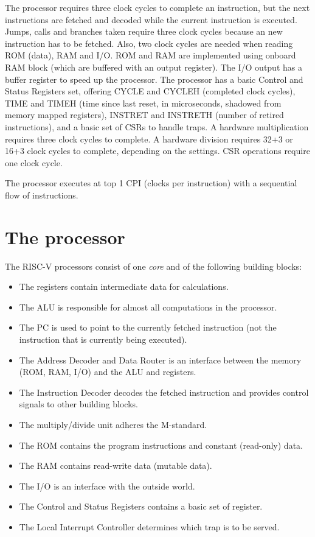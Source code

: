 \documentclass[12pt]{article}
\begin{document}
The processor requires three clock cycles to complete an instruction, but the next instructions are fetched and decoded while the current instruction is executed. Jumps, calls and branches taken require three clock cycles because an new instruction has to be fetched. Also, two clock cycles are needed when reading ROM (data), RAM and I/O. ROM and RAM are implemented using onboard RAM block (which are buffered with an output register). The I/O output has a buffer register to speed up the processor. The processor has a basic Control and Status Registers set, offering CYCLE and CYCLEH (completed clock cycles), TIME and TIMEH (time since last reset, in microseconds, shadowed from memory mapped registers), INSTRET and INSTRETH (number of retired instructions), and a basic set of CSRs to handle traps. A hardware multiplication requires three clock cycles to complete. A hardware division requires 32+3 or 16+3 clock cycles to complete, depending on the settings. CSR operations require one clock cycle.

The processor executes at top 1 CPI (clocks per instruction) with a sequential flow of instructions.

\section{The processor}
The RISC-V processors consist of one \textit{core} and of the following building blocks:

\begin{itemize}
\item The registers contain intermediate data for calculations.
\item The ALU is responsible for almost all computations in the processor.
\item The PC is used to point to the currently fetched instruction (not the instruction that is currently being executed).
\item The Address Decoder and Data Router is an interface between the memory (ROM, RAM, I/O) and the ALU and registers.
\item The Instruction Decoder decodes the fetched instruction and provides control signals to other building blocks.
\item The multiply/divide unit adheres the M-standard.
\item The ROM contains the program instructions and constant (read-only) data.
\item The RAM contains read-write data (mutable data).
\item The I/O is an interface with the outside world.
\item The Control and Status Registers contains a basic set of register.
\item The Local Interrupt Controller determines which trap is to be served.
\end{itemize}
\end{document}
